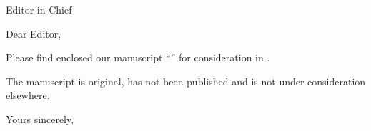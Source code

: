 \documentclass[11pt,a4paper]{letter}
\begin{document}
\begin{letter}{Editor-in-Chief\\}
\opening{Dear Editor,}

Please find enclosed our manuscript ``'' for consideration in .


The manuscript is original, has not been published and is not under consideration elsewhere.

\closing{Yours sincerely,}
\end{letter}
\end{document}
